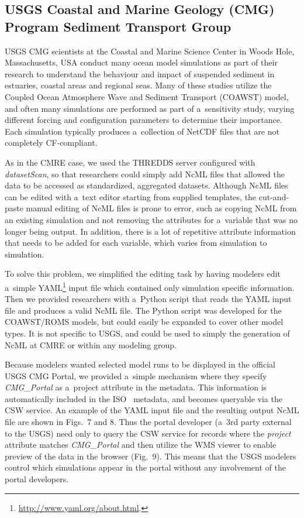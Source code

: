 \documentclass[osd, online, hvmath]{copernicus}
\begin{document}
\subsection{USGS Coastal and Marine Geology (CMG) Program Sediment Transport
  Group}

USGS CMG scientists at the Coastal and
Marine Science Center in Woods Hole, Massachusetts, USA conduct many ocean model
simulations as part of their research to understand the behaviour and
impact of suspended sediment in estuaries, coastal areas and regional
seas. Many of these studies utilize the Coupled Ocean Atmosphere Wave
and Sediment Transport (COAWST) model, and often many simulations are
performed as part of a~sensitivity study, varying different forcing
and configuration parameters to determine their importance. Each
simulation typically produces a~collection of NetCDF files that are
not completely CF-compliant.

As in the CMRE case, we used the THREDDS server configured with
\textit{datasetScan}, so that researchers could simply add NcML files
that allowed the data to be accessed as standardized, aggregated
datasets. Although NcML files can be edited with a~text editor
starting from supplied templates, the cut-and-paste manual editing of
NcML files is prone to error, such as copying NcML from an existing
simulation and not removing the attributes for a~variable that
was no longer being output. In addition, there is a lot of repetitive
attribute information that needs to be added for each variable, which
varies from simulation to simulation. 

To solve this problem, we simplified the
editing task by having modelers edit a~simple YAML\footnote{\url{http://www.yaml.org/about.html}.} input file which contained only simulation
specific information. Then we provided researchers with a~Python
script that reads the YAML input file and produces a valid NcML file. The Python script
was developed for the COAWST/ROMS models, but could easily be expanded
to cover other model types.  It is not specific to USGS, and could be 
used to simply the generation of NcML at CMRE or within any modeling group. 

Because modelers wanted selected model runs to be displayed in the
official USGS CMG Portal, we provided a~simple mechanism where they
specify \textit{CMG\_Portal} as a~project attribute in the
metadata. This information is automatically included in the ISO~
metadata, and becomes queryable via the CSW service. An example of the
YAML input file and the resulting output NcML file are shown in
Figs.~7 and 8. Thus the portal developer (a~3rd party external to the
USGS) need only to query the CSW service for records where the
\textit{project} attribute matches \textit{CMG\_Portal} and then
utilize the WMS 
viewer to enable preview of the data in the browser
(Fig.~9).  This means that the USGS modelers control which simulations appear in the portal without any involvement of the portal developers.  
\end{document}
